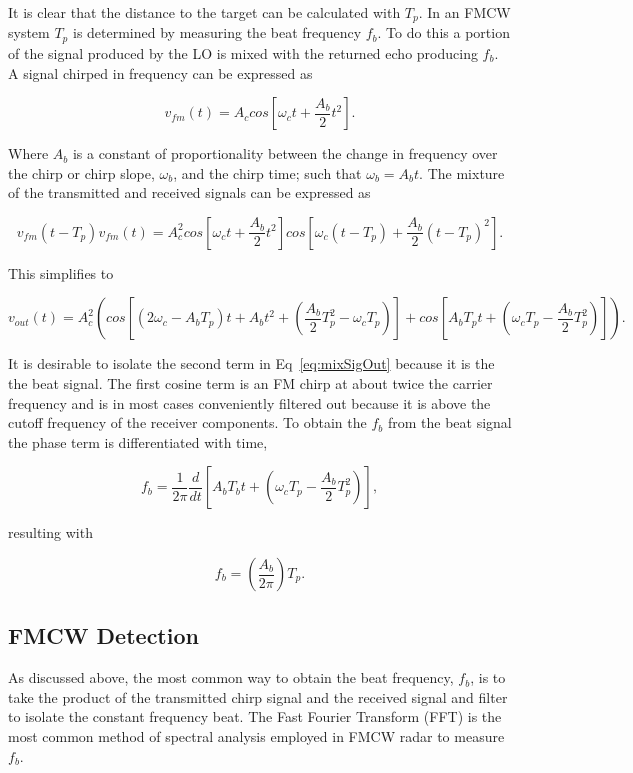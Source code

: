It is clear that the distance to the target can be calculated with $T_p$. In an FMCW system
$T_p$ is determined by measuring the beat frequency $f_b$. To do this a portion of the signal
produced by the LO is mixed with the returned echo producing $f_b$. A signal chirped in frequency
can be expressed as

\begin{equation}
\label{eq:chirpSig}
v_{fm}(t)=A_c cos[\omega_ct+\frac{A_b}{2} t^2].
\end{equation}

Where $A_b$ is a constant of proportionality between the change in frequency over the chirp or chirp slope, $\omega_b$,
and the chirp time; such that $\omega_b=A_bt$. The mixture of the transmitted and received signals can be 
expressed as

\begin{equation}
\label{eq:mixSig}
v_{fm}(t-T_p)v_{fm}(t)=A_c^2 cos[\omega_c t +\frac{A_b}{2}t^2]cos[\omega_c(t-T_p)+\frac{A_b}{2} (t-T_p)^2].
\end{equation}

This simplifies to 

\begin{equation}
\label{eq:mixSigOut}
v_{out}(t)=A_c^2 (cos[(2\omega_c-A_bT_p)t+A_bt^2+(\frac{A_b}{2}T_p^2-\omega_cT_p)]+cos[A_bT_pt+(\omega_cT_p-\frac{A_b}{2}T_p^2)]).
\end{equation}

It is desirable to isolate the second term in Eq~\ref{eq:mixSigOut} because it is the the beat signal. 
The first cosine term is an FM chirp at about twice the carrier frequency and is in most cases 
conveniently filtered out because it is above the cutoff frequency of the receiver components.
To obtain the $f_b$ from the beat signal the phase term is differentiated with time, 

\begin{equation}
\label{eq:phaseDiff}
f_b=\frac{1}{2\pi}\frac{d}{dt}[A_bT_bt+(\omega_cT_p-\frac{A_b}{2}T_p^2)],
\end{equation}

resulting with

\begin{equation}
\label{eq:fb}
f_b=(\frac{A_b}{2\pi})T_p.
\end{equation}

\subsection{FMCW Detection}
As discussed above, the most common way to obtain the beat frequency, $f_b$, is to 
take the product of the transmitted chirp signal and the received signal and filter 
to isolate the constant frequency beat. The Fast Fourier Transform (FFT) is the most
common method of spectral analysis employed in FMCW radar to measure $f_b$. 


